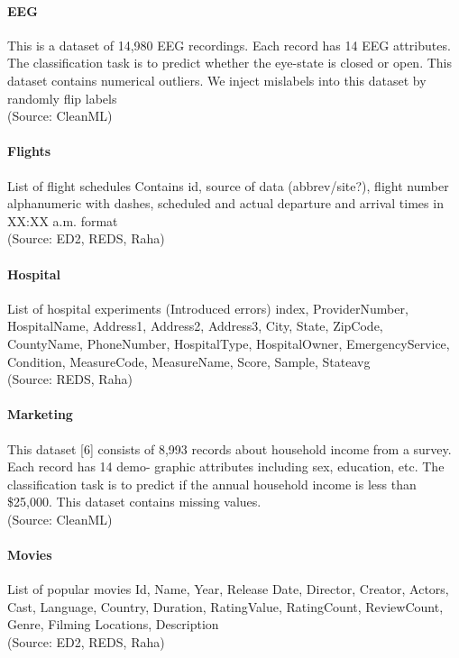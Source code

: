 \paragraph{EEG}
This is a dataset of 14,980 EEG recordings. Each record
has 14 EEG attributes. The classification task is to predict whether
the eye-state is closed or open. This dataset contains numerical outliers. We inject mislabels into this dataset by randomly flip labels
\\(Source: CleanML)

\paragraph{Flights}
List of flight schedules
Contains id, source of data (abbrev/site?), flight number alphanumeric with dashes, scheduled and actual departure and arrival times in XX:XX a.m. format
\\(Source: ED2, REDS, Raha)

\paragraph{Hospital}
List of hospital experiments (Introduced errors)
index, ProviderNumber, HospitalName, Address1, Address2, Address3, City, State, ZipCode, CountyName, PhoneNumber, HospitalType, HospitalOwner, EmergencyService, Condition, MeasureCode, MeasureName, Score, Sample, Stateavg
\\(Source: REDS, Raha)

\paragraph{Marketing}
This dataset [6] consists of 8,993 records about
household income from a survey. Each record has 14 demo-
graphic attributes including sex, education, etc. The classification task is to predict if the annual household income is less than \$25,000. This dataset contains missing values.
\\(Source: CleanML)

\paragraph{Movies}
List of popular movies
Id, Name, Year, Release Date, Director, Creator, Actors, Cast, Language, Country, Duration, RatingValue, RatingCount, ReviewCount, Genre, Filming Locations, Description
\\(Source: ED2, REDS, Raha)

